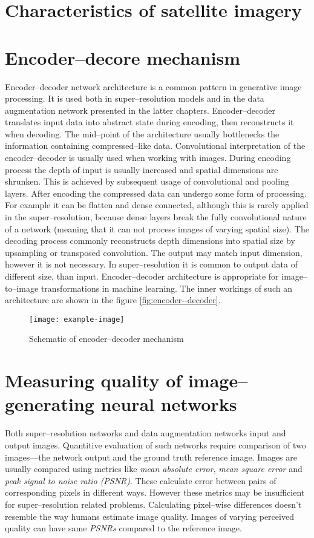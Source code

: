 \section{Characteristics of satellite imagery}

\section{Encoder--decore mechanism}
Encoder--decoder network architecture is a common pattern in generative image processing.
It is used both in super--resolution models and in the data augmentation network presented in the latter chapters.
Encoder--decoder translates input data into abstract state during encoding, then reconstructs it when decoding.
The mid--point of the architecture usually bottlenecks the information containing compressed--like data.
Convolutional interpretation of the encoder--decoder is usually used when working with images.
During encoding process the depth of input is usually increased and spatial dimensions are shrunken.
This is achieved by subsequent usage of convolutional and pooling layers.
After encoding the compressed data can undergo some form of processing.
For example it can be flatten and dense connected, although this is rarely applied in the super--resolution, because dense layers break the fully convolutional nature of a network (meaning that it can not process images of varying spatial size).
The decoding process commonly reconstructs depth dimensions into spatial size by upsampling or transposed convolution.
The output may match input dimension, however it is not necessary.
In super--resolution it is common to output data of different size, than input.
Encoder--decoder architecture is appropriate for image--to--image transformations in machine learning.
The inner workings of such an architecture are shown in the figure \ref{fig:encoder--decoder}. 
\begin{figure}
    \centering
    \texttt{[image: example-image]}
    \caption{Schematic of encoder--decoder mechanism}
    \label{fig:encoder-decoder}
\end{figure}


\section{Measuring quality of image--generating neural networks}

Both super--resolution networks and data augmentation networks input and output images.
Quantitive evaluation of such networks require comparison of two images---the network output and the ground truth reference image.
Images are usually compared using metrics like \textit{mean absolute error}, \textit{mean square error} and \textit{peak signal to noise ratio (PSNR)}.
These calculate error between pairs of corresponding pixels in different ways.
However these metrics may be insufficient for super--resolution related problems.
Calculating pixel--wise differences doesn't resemble the way humans estimate image quality.
Images of varying perceived quality can have same \textit{PSNRs} compared to the reference image.

